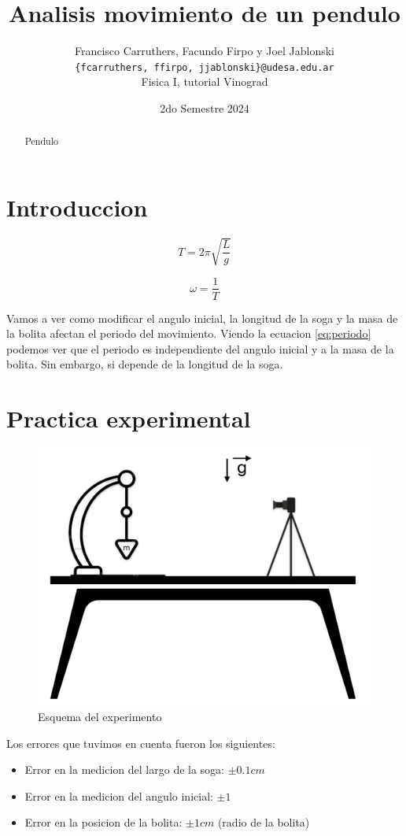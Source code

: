 \documentclass[12pt,a4]{article}
\title{Analisis movimiento de un pendulo}
\author{Francisco Carruthers, Facundo Firpo y Joel Jablonski\\ [2mm]
\small \texttt{\{fcarruthers, ffirpo, jjablonski\}@udesa.edu.ar}\\
\small Fisica I, tutorial Vinograd}
\date{2do Semestre 2024}
\begin{document}
\maketitle

\begin{abstract}
    Pendulo
\end{abstract}

\section{Introduccion}

\begin{equation}
    T = 2 \pi \sqrt{\frac{L}{g}}
    \label{eq:periodo}
\end{equation}

\begin{equation}
    \omega = \frac{1}{T}
    \label{eq:omega}
\end{equation}

Vamos a ver como modificar el angulo inicial, la longitud de la soga y la masa de la bolita afectan el periodo del movimiento. Viendo la ecuacion \ref{eq:periodo} podemos ver que el periodo es independiente del angulo inicial y a la masa de la bolita. Sin embargo, si depende de la longitud de la soga. 

\section{Practica experimental}

\begin{figure}[H]
    \centering
    \includegraphics[width=0.6\linewidth]{TP2/esquema.png}
    \caption{Esquema del experimento}   
    \label{fig:largo}
\end{figure}

Los errores que tuvimos en cuenta fueron los siguientes:

\begin{itemize}
    \item Error en la medicion del largo de la soga: $\pm 0.1 cm$
    \item Error en la medicion del angulo inicial: $\pm 1$
    \item Error en la posicion de la bolita: $\pm 1 cm$ (radio de la bolita)
\end{itemize}
\end{document}
